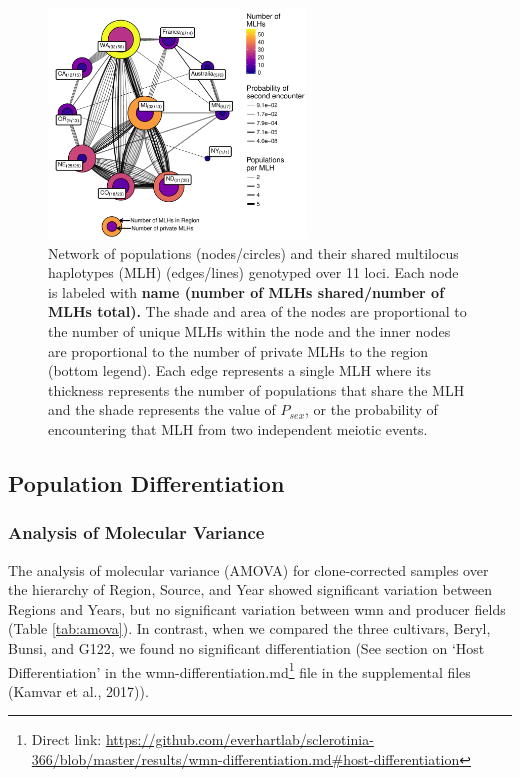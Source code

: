 \documentclass[fleqn,10pt,lineno]{wlpeerj} %
\theoremstyle{definition}
\theoremstyle{definition}
\theoremstyle{definition}
\theoremstyle{remark}
\begin{document}
\begin{figure}
\centering
\includegraphics[width=0.61000\textwidth]{../../results/figures/publication/mlg-11.pdf}
\caption{Network of populations (nodes/circles) and their shared
multilocus haplotypes (MLH) (edges/lines) genotyped over 11 loci. Each
node is labeled with \textbf{name (number of MLHs shared/number of MLHs
total).} The shade and area of the nodes are proportional to the number
of unique MLHs within the node and the inner nodes are proportional to
the number of private MLHs to the region (bottom legend). Each edge
represents a single MLH where its thickness represents the number of
populations that share the MLH and the shade represents the value of
\(P_{sex}\), or the probability of encountering that MLH from two
independent meiotic events.}\label{community-graph}
\end{figure}

\subsection*{Population
Differentiation}\label{population-differentiation-1}

\subsubsection*{Analysis of Molecular
Variance}\label{analysis-of-molecular-variance}

The analysis of molecular variance (AMOVA) for clone-corrected samples
over the hierarchy of Region, Source, and Year showed significant
variation between Regions and Years, but no significant variation
between wmn and producer fields (Table \ref{tab:amova}). In contrast,
when we compared the three cultivars, Beryl, Bunsi, and G122, we found
no significant differentiation (See section on `Host Differentiation' in
the wmn-differentiation.md\footnote{Direct link:
  \url{https://github.com/everhartlab/sclerotinia-366/blob/master/results/wmn-differentiation.md\#host-differentiation}}
file in the supplemental files (Kamvar et al., 2017)).
\end{document}
